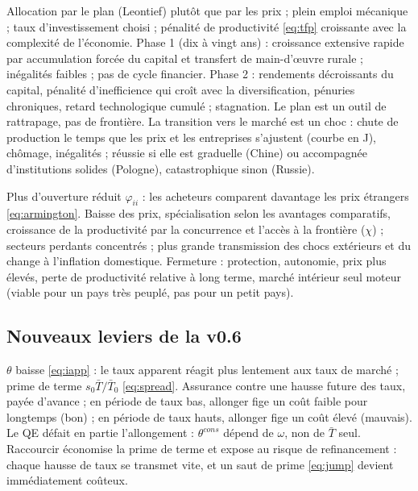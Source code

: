 \documentclass[11pt,a4paper]{article}
\begin{document}
\direct Allocation par le plan (Leontief) plutôt que par les prix ; plein emploi mécanique ; taux d'investissement choisi ; pénalité de productivité \eqref{eq:tfp} croissante avec la complexité de l'économie.
\second Phase 1 (dix à vingt ans) : croissance extensive rapide par accumulation forcée du capital et transfert de main-d'œuvre rurale ; inégalités faibles ; pas de cycle financier. Phase 2 : rendements décroissants du capital, pénalité d'inefficience qui croît avec la diversification, pénuries chroniques, retard technologique cumulé ; stagnation. Le plan est un outil de rattrapage, pas de frontière.
\baisse La transition vers le marché est un choc : chute de production le temps que les prix et les entreprises s'ajustent (courbe en J), chômage, inégalités ; réussie si elle est graduelle (Chine) ou accompagnée d'institutions solides (Pologne), catastrophique sinon (Russie).

\direct Plus d'ouverture réduit $\varphi_{ii}$ : les acheteurs comparent davantage les prix étrangers \eqref{eq:armington}.
\second Baisse des prix, spécialisation selon les avantages comparatifs, croissance de la productivité par la concurrence et l'accès à la frontière ($\chi$) ; secteurs perdants concentrés ; plus grande transmission des chocs extérieurs et du change à l'inflation domestique.
\baisse Fermeture : protection, autonomie, prix plus élevés, perte de productivité relative à long terme, marché intérieur seul moteur (viable pour un pays très peuplé, pas pour un petit pays).

\subsection{Nouveaux leviers de la v0.6}

\direct $\theta$ baisse \eqref{eq:iapp} : le taux apparent réagit plus lentement aux taux de marché ; prime de terme $s_0\bar T/\bar T_0$ \eqref{eq:spread}.
\second Assurance contre une hausse future des taux, payée d'avance ; en période de taux bas, allonger fige un coût faible pour longtemps (bon) ; en période de taux hauts, allonger fige un coût élevé (mauvais). Le QE défait en partie l'allongement : $\theta^{cons}$ dépend de $\omega$, non de $\bar T$ seul.
\baisse Raccourcir économise la prime de terme et expose au risque de refinancement : chaque hausse de taux se transmet vite, et un saut de prime \eqref{eq:jump} devient immédiatement coûteux.
\end{document}
